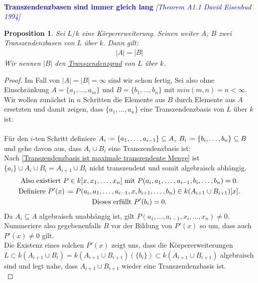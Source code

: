 \documentclass[10pt,a4paper]{report}
\newcommand{\comment}[1]{}
\newcommand{\ModulsOfDifferenzials}{David Eisenbud 1994}
\newcounter{Aussage}[chapter]
\newtheorem{prop}[Aussage]{Proposition}
\newcommand*{\defeq}{\mathrel{\vcenter{\baselineskip0.5ex \lineskiplimit0pt
                     \hbox{\scriptsize.}\hbox{\scriptsize.}}}%
                     =}
\begin{document}
\ \\
\textcolor{blue}{\textbf{Transzendenzbasen sind immer gleich lang} \textit{[Theorem A1.1 \ModulsOfDifferenzials]}}
\begin{prop}\comment{\label{Transzendenzbasen sind immer gleich lang}}
Sei $L / k$ eine Körpererweiterung. Seinen weiter $A$, $B$ zwei Transzendenzbasen von $L$ über $k$. Dann gilt:
\begin{gather*}
\vert A \vert = \vert B \vert
\end{gather*}
Wir nennen $\vert B \vert$ den \underline{Transzendenzgrad} von $L$ über $k$.
\end{prop}
\begin{proof}
Im Fall von $\vert A \vert = \vert B \vert = \infty$ sind wir schon fertig, Sei also ohne Einschränkung $A = \lbrace a_1, \dots , a_m \rbrace$ und $B = \lbrace b_1, \dots , b_n \rbrace$ mit $min(m,n) = n < \infty$.\\
Wir wollen zunächst in $n$ Schritten die Elemente aus $B$ durch Elemente aus $A$ ersetzten und damit zeigen, dass $\lbrace a_1, \dots , a_n \rbrace$ eine Transzendenzbasis von $L$ über $k$ ist:\\
\ \\
Für den $i$-ten Schritt definiere $A_i \defeq \lbrace a_1,\dots,a_{i-1} \rbrace \subseteq A$, $B_i \defeq \lbrace b_i,\dots,b_n \rbrace \subseteq B$ und gehe davon aus, dass $A_i \cup B_i$ eine Transzendenzbasis ist:\\
Nach \cref{Transzendenzbasis ist maximale transzendente Menge} ist $\lbrace a_i \rbrace \cup A_{i} \cup B_{i} = A_{i+1} \cup B_{i}$ nicht transzendent und somit algebraisch abhängig.
\begin{gather*}
\text{Also existiert } P \in k[x,x_1,\dots,x_n] \text{ mit } P(a_i,a_1,\dots,a_{i-1},b_i,\dots,b_n) = 0. \\
\text{Definiere } P'(x) \defeq P(a_i,a_1,\dots,a_{i-1},x,b_{i+1},\dots,b_n) \in k(A_{i+1} \cup B_{i+1})[x].\\
\text{Dieses erfüllt } P'(b_i) = 0.
\end{gather*}
Da $A_i \subseteq A$ algebraisch unabhängig ist, gilt $P(a_1,\dots,a_{i-1},x_i,\dots,x_n) \neq 0$. Nummeriere also gegebenenfalls $B$ vor der Bildung von $P'(x)$ so um, dass auch $P'(x) \neq 0$ gilt.\\
Die Existenz eines solchen $P'(x)$ zeigt uns, dass die Körpererweiterungen \\$L \subset k(A_{i+1} \cup B_i) = k(A_{i+1} \cup B_{i+1})(\lbrace b_i \rbrace) \subset k(A_{i+1} \cup B_{i+1})$ algebraisch sind und legt nahe, dass $A_{i+1} \cup B_{i+1}$ wieder eine Transzendenzbasis ist.\\

\end{proof}
\end{document}

